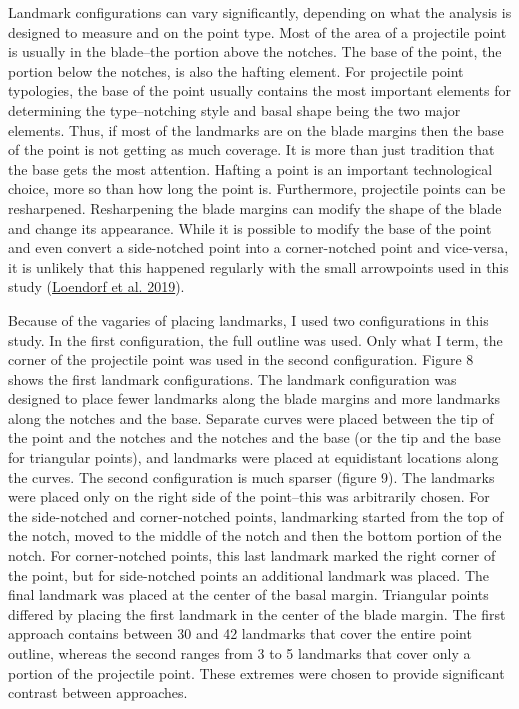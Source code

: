 \documentclass{article}
\begin{document}
Landmark configurations can vary significantly, depending on what the
analysis is designed to measure and on the point type. Most of the area
of a projectile point is usually in the blade--the portion above the
notches. The base of the point, the portion below the notches, is also
the hafting element. For projectile point typologies, the base of the
point usually contains the most important elements for determining the
type--notching style and basal shape being the two major elements. Thus,
if most of the landmarks are on the blade margins then the base of the
point is not getting as much coverage. It is more than just tradition
that the base gets the most attention. Hafting a point is an important
technological choice, more so than how long the point is. Furthermore,
projectile points can be resharpened. Resharpening the blade margins can
modify the shape of the blade and change its appearance. While it is
possible to modify the base of the point and even convert a side-notched
point into a corner-notched point and vice-versa, it is unlikely that
this happened regularly with the small arrowpoints used in this study
(\protect\hyperlink{ref-Loendorf2019-df}{Loendorf et al. 2019}).

Because of the vagaries of placing landmarks, I used two configurations
in this study. In the first configuration, the full outline was used.
Only what I term, the corner of the projectile point was used in the
second configuration. Figure 8 shows the first landmark configurations.
The landmark configuration was designed to place fewer landmarks along
the blade margins and more landmarks along the notches and the base.
Separate curves were placed between the tip of the point and the notches
and the notches and the base (or the tip and the base for triangular
points), and landmarks were placed at equidistant locations along the
curves. The second configuration is much sparser (figure 9). The
landmarks were placed only on the right side of the point--this was
arbitrarily chosen. For the side-notched and corner-notched points,
landmarking started from the top of the notch, moved to the middle of
the notch and then the bottom portion of the notch. For corner-notched
points, this last landmark marked the right corner of the point, but for
side-notched points an additional landmark was placed. The final
landmark was placed at the center of the basal margin. Triangular points
differed by placing the first landmark in the center of the blade
margin. The first approach contains between 30 and 42 landmarks that
cover the entire point outline, whereas the second ranges from 3 to 5
landmarks that cover only a portion of the projectile point. These
extremes were chosen to provide significant contrast between approaches.
\end{document}
